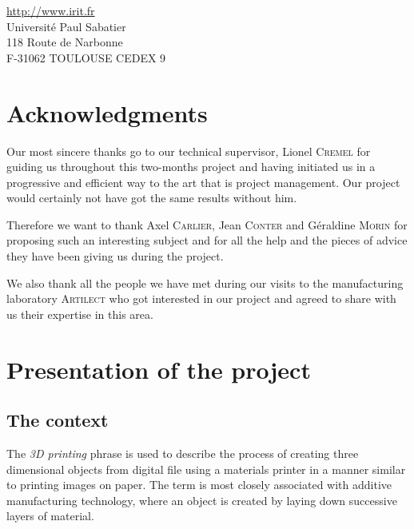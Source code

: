 \documentclass{report}
\begin{document}
\begin{center}
\url{http://www.irit.fr}\\
Université Paul Sabatier \\
118 Route de Narbonne \\
F-31062 TOULOUSE CEDEX 9
\end{center}

\thispagestyle{empty}

\newpage

\chapter*{Acknowledgments}

	Our most sincere thanks go to our technical supervisor, Lionel \textsc{Cremel} for guiding us throughout this two-months project and having initiated us in a progressive and efficient way to the art that is project management. Our project would certainly not have got the same results without him.\\

\bigskip

	Therefore we want to thank Axel \textsc{Carlier}, Jean \textsc{Conter} and Géraldine \textsc{Morin} for proposing such an interesting subject and for all the help and the pieces of advice they have been giving us during the project.\\

\bigskip

	We also thank all the people we have met during our visits to the manufacturing laboratory \textsc{Artilect} who got interested in our project and agreed to share with us their expertise in this area.

\tableofcontents

\chapter{Presentation of the project}

\section{The context}

	The \textit{3D printing} phrase is used to describe the process of creating three dimensional objects from digital file using a materials printer in a manner similar to printing images on paper. The term is most closely associated with additive manufacturing technology, where an object is created by laying down successive layers of material.\\
\end{document}
